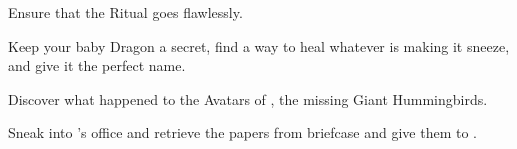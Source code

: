 \documentclass[char]{GL2020}
\begin{document}











\begin{itemz}[Goals]
	\item Ensure that the Ritual goes flawlessly.
	\item Keep your baby Dragon a secret, find a way to heal whatever is making it sneeze, and give it the perfect name.
	\item Discover what happened to the Avatars of \cFarmGod{}, the missing Giant Hummingbirds.
	\item Sneak into \cBunker{}’s office and retrieve the papers from  briefcase and give them to \cWildCard{}.
\end{itemz}
\end{document}
